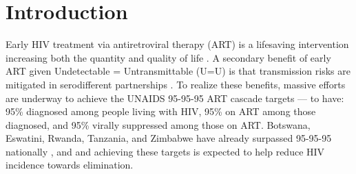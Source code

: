 \section{Introduction}\label{art.intro}
Early HIV treatment via antiretroviral therapy (ART) is a lifesaving intervention
increasing both the quantity and quality of life \cite{Lundgren2015init}.
A secondary benefit of early ART given Undetectable = Untransmittable (U=U) is that
transmission risks are mitigated in serodifferent partnerships \cite{Cohen2016}.
To realize these benefits, massive efforts are underway to achieve
the UNAIDS 95-95-95 ART cascade targets \cite{UNAIDS2023} --- \ie to have:
95\% diagnosed among people living with HIV,
95\% on ART among those diagnosed, and
95\% virally suppressed among those on ART.
Botswana, Eswatini, Rwanda, Tanzania, and Zimbabwe
have already surpassed 95-95-95 nationally \cite{UNAIDS2023}, and
and achieving these targets is expected to help reduce HIV incidence towards elimination.
